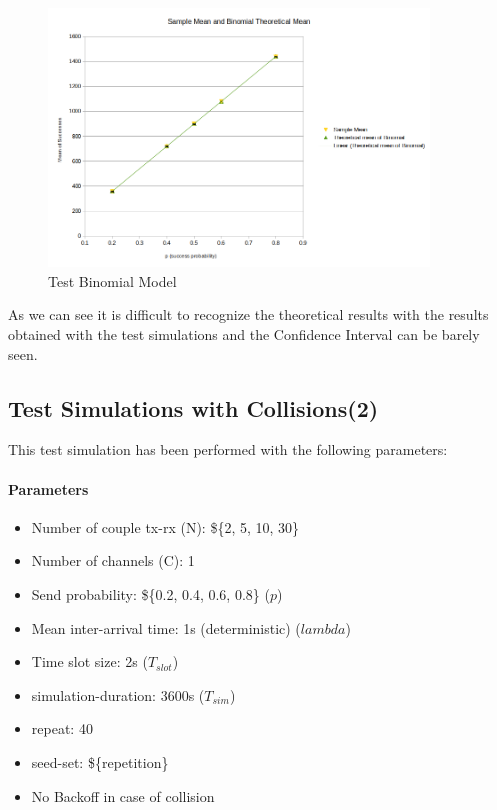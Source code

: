 \begin{figure}[H]
	\centering
	\includegraphics[width=0.9\textwidth]{img/plotTheoreticalMeanBinomial.png}
	\caption{Test Binomial Model}
\end{figure}

As we can see it is difficult to recognize the theoretical results with the results obtained with the test simulations and the Confidence Interval can be barely seen.

\subsection{Test Simulations with Collisions(2)}
This test simulation has been performed with the following parameters:
\paragraph{Parameters}
\begin{itemize}
	\item Number of couple tx-rx (N): \$\{2, 5, 10, 30\}
	\item Number of channels (C): 1
	\item Send probability: \$\{0.2, 0.4, 0.6, 0.8\} ($p$)
	\item Mean inter-arrival time: 1s (deterministic) ($lambda$)
	\item Time slot size: 2s ($T_{slot}$)
	\item simulation-duration: 3600s ($T_{sim}$)
	\item repeat: 40
	\item seed-set: \$\{repetition\}
	\item No Backoff in case of collision
\end{itemize}

